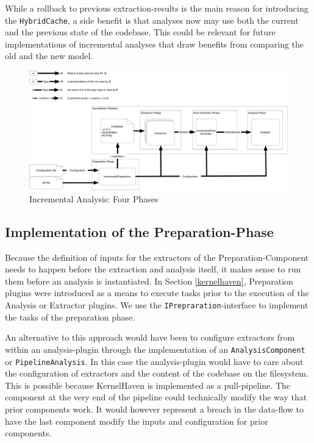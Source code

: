 \documentclass[a4paper]{article}
\begin{document}
While a rollback to previous extraction-results is the main reason for introducing the \texttt{HybridCache}, a side benefit is that analyses now may use both the current and the previous state of the codebase. This could be relevant for future implementations of incremental analyses that draw benefits from comparing the old and the new model. 

\clearpage
\begin{figure}[h] 
  \centering
  \begin{minipage}[b]{1\textwidth} 
    \caption[Incremental Analysis: Four Phases]{Incremental Analysis: Four Phases}\label{4-phases}
    \centering
    \includegraphics[width=0.9\textheight, angle=90]{img/KernelHavenIncremental.pdf}
  \end{minipage}
\end{figure}
\clearpage


\subsection{Implementation of the Preparation-Phase}\label{preparation-phase}

Because the definition of inputs for the extractors of the Preparation-Component needs to happen before the extraction and analysis itself, it makes sense to run them before an analysis is instantiated. In Section \ref{kernelhaven}, Preparation plugins were introduced as a means to execute tasks prior to the execution of the Analysis or Extractor plugins. We use the \texttt{IPrepraration}-interface to implement the tasks of the preparation phase.

An alternative to this approach would have been to configure extractors from within an analysis-plugin through the implementation of an \texttt{AnalysisComponent} or \texttt{PipelineAnalysis}. In this case the analysis-plugin would have to care about the configuration of extractors and the content of the codebase on the filesystem. This is possible because KernelHaven is implemented as a pull-pipeline. The component at the very end of the pipeline could technically modify the way that prior components work. It would however represent a breach in the data-flow to have the last component modify the inputs and configuration for prior  components. 
\end{document}
